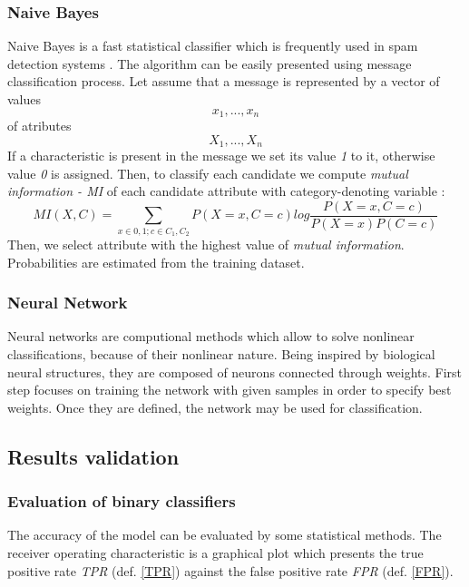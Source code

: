 	\subsubsection{Naive Bayes}
	Naive Bayes is a fast statistical classifier which is frequently used in spam detection systems \cite{naive-bayesian}.  
The algorithm can be easily presented using message classification process. Let assume that a message is represented by a vector of values 
\[x_1, ..., x_n\]
of atributes
\[X_1, ..., X_n\]
If a characteristic is present in the message we set its value \textit{1} to it, otherwise value \textit{0} is assigned. Then, to classify each candidate we compute \textit{mutual information - MI} of each candidate attribute with category-denoting variable \cite{neive-bayesian}:
\[MI(X,C)=\sum_{x\in {0,1};c\in{C_1,C_2}}P(X=x,C=c)log\frac{P(X=x,C=c)}{P(X=x)P(C=c)}\]
Then, we select attribute with the highest value of \textit{mutual information}. Probabilities are estimated from the training dataset.
	\subsubsection{Neural Network}
	Neural networks are computional methods which allow to solve nonlinear classifications, because of their nonlinear nature. Being inspired by biological neural structures, they are composed of neurons connected through weights. First step focuses on training the network with given samples \cite{fe_signal_processing} in order to specify best weights. Once they are defined, the network may be used for classification.

	
\subsection{Results validation}
\subsubsection{Evaluation of binary classifiers}
 The accuracy of the model can be evaluated by some statistical methods.
  The receiver operating characteristic is a graphical plot which presents the true positive rate \textit{TPR} (def. \ref{TPR}) against the false positive rate \textit{FPR} (def. \ref{FPR}).
  
